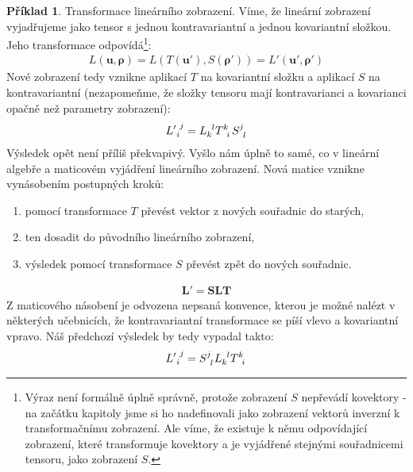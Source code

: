 \documentclass[a5paper,12pt]{amsbook}
\theoremstyle{definition}
\newtheorem{example}{Příklad}[chapter]
\newcommand{\myvec}[1]{\bm{#1}}
\newcommand{\mymatrix}[1]{\mathbf{#1}}
\begin{document}
\begin{example}
Transformace lineárního zobrazení. Víme, že lineární zobrazení vyjadřujeme
jako tensor s jednou kontravariantní a jednou kovariantní složkou. Jeho
transformace odpovídá\footnote{
	Výraz není formálně úplně správně, protože zobrazení $S$ nepřevádí kovektory - na začátku
	kapitoly jsme si ho nadefinovali jako zobrazení vektorů inverzní k transformačnímu
	zobrazení. Ale víme, že existuje k němu odpovídající zobrazení, které transformuje
	kovektory a je vyjádřené stejnými souřadnicemi tensoru, jako zobrazení $S$.
}:
\begin{equation*}
\begin{split}
L(\myvec{u}, \myvec{\rho}) = L(T(\myvec{u'}), S(\myvec{\rho'})) = L'(\myvec{u'}, \myvec{\rho'})
\end{split}
\end{equation*}
Nové zobrazení tedy vznikne aplikací $T$ na kovariantní složku a aplikací $S$ na kontravariantní
(nezapomeňme, že složky tensoru mají kontravarianci a kovarianci opačně než parametry zobrazení):
\begin{equation*}
\begin{split}
{L'}\indices{_i^j} = L\indices{_k^l} T\indices{^k_i} S\indices{^j_l}
\end{split}
\end{equation*}
Výsledek opět není příliš překvapivý. Vyšlo nám úplně to samé, co v lineární algebře
a maticovém vyjádření lineárního zobrazení. Nová matice vznikne vynásobením postupných
kroků:
\begin{enumerate}
\item pomocí transformace $T$ převést vektor z nových souřadnic do starých,
\item ten dosadit do původního lineárního zobrazení,
\item výsledek pomocí transformace $S$ převést zpět do nových souřadnic.
\end{enumerate}
\begin{equation*}
\begin{split}
\mymatrix{L'} = \mymatrix{S}\mymatrix{L}\mymatrix{T}
\end{split}
\end{equation*}
Z maticového násobení je odvozena nepsaná konvence, kterou je možné nalézt
v některých učebnicích, že kontravariantní transformace se píší vlevo
a kovariantní vpravo. Náš předchozí výsledek by tedy vypadal takto:
\begin{equation*}
\begin{split}
{L'}\indices{_i^j} = S\indices{^j_l} L\indices{_k^l} T\indices{^k_i} 
\end{split}
\end{equation*}
\end{example}
\end{document}
